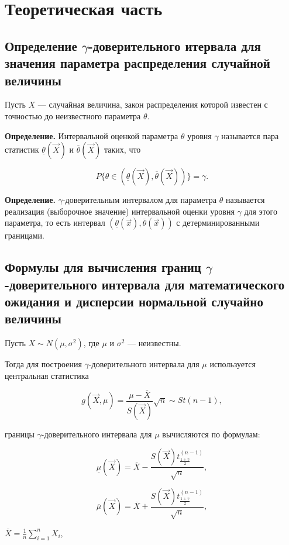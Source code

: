 \chapter{Теоретическая часть}

\section{Определение $\gamma$-доверительного итервала для значения параметра
распределения случайной величины}

Пусть $X$ --- случайная величина, закон распределения которой известен с
точностью до неизвестного параметра $\theta$.

\textbf{Определение.} Интервальной оценкой параметра $\theta$ уровня $\gamma$
называется пара статистик $\underline \theta (\vec X)$ и $\overline \theta
(\vec X)$ таких, что

$$ P\{\theta \in (\underline \theta (\vec X), \overline \theta (\vec X))\} = \gamma.$$

\textbf{Определение.} $\gamma$-доверительным интервалом для параметра $\theta$
называется реализация (выборочное значение) интервальной оценки уровня $\gamma$
для этого параметра, то есть интервал $(\underline \theta (\vec x), \overline
\theta (\vec x))$ с детерминированными границами.

\section{Формулы для вычисления границ $\gamma$-доверительного интервала
для математического ожидания и дисперсии нормальной случайно величины}

Пусть $X \sim N(\mu, \sigma^2)$, где $\mu$ и $\sigma^2$ --- неизвестны.

Тогда для построения $\gamma$-доверительного интервала для $\mu$ используется
центральная статистика

$$g(\vec X, \mu) = \frac{\mu - \overline X}{S(\vec X)} \sqrt n \sim St(n - 1),$$

 границы $\gamma$-доверительного интервала для $\mu$ вычисляются по
формулам:

$$\underline \mu (\vec X) = \overline X - \frac{S(\vec X)t^{(n-1)}_{\frac{1 +
\gamma}{2}}}{\sqrt n},$$

$$\overline \mu (\vec X) = \overline X + \frac{S(\vec X)t^{(n-1)}_{\frac{1 +
\gamma}{2}}}{\sqrt n},$$

 $\overline X = \frac{1}{n} \sum\limits_{i=1}^{n} X_i$,

